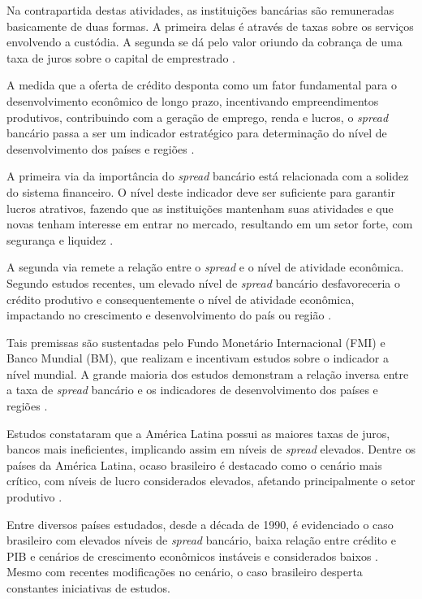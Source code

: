 \documentclass[
  12pt,
  12pt,
  openright,
  oneside,
  a4paper,
  chapter=TITLE,
  section=TITLE,
  subsection=TITLE,
  subsubsection=TITLE,
  english,
  portugues,
  sumario=tradicional]{abntex2}
\begin{document}
Na contrapartida destas atividades, as instituições bancárias são remuneradas basicamente de duas formas. A primeira delas é através de taxas sobre os serviços envolvendo a custódia. A segunda se dá pelo valor oriundo da cobrança de uma taxa de juros sobre o capital de emprestrado \cite{leite:1996, campello:2005, neves:2007}.

A medida que a oferta de crédito desponta como um fator fundamental para o desenvolvimento econômico de longo prazo, incentivando empreendimentos produtivos, contribuindo com a geração de emprego, renda e lucros, o \emph{spread} bancário passa a ser um indicador estratégico para determinação do nível de desenvolvimento dos países e regiões \cite{WB:2005, levine:1997}.

A primeira via da importância do \emph{spread} bancário está relacionada com a
solidez do sistema financeiro. O nível deste indicador deve ser suficiente para
garantir lucros atrativos, fazendo que as instituições mantenham suas
atividades e que novas tenham interesse em entrar no mercado, resultando em um
setor forte, com segurança e liquidez \cite{levine:1997, dantas:2012} \cite{leal:2006}.

A segunda via remete a relação entre o \emph{spread} e o nível de atividade
econômica. Segundo estudos recentes, um elevado nível de \emph{spread} bancário
desfavoreceria o crédito produtivo e consequentemente o nível de atividade
econômica, impactando no crescimento e desenvolvimento do país ou região \cite{WB:2005, dantas:2012, leal:2006}.

Tais premissas são sustentadas pelo Fundo Monetário Internacional (FMI) e Banco Mundial (BM), que realizam e incentivam estudos sobre o indicador a nível mundial. A grande maioria dos estudos demonstram a relação inversa entre a taxa de \emph{spread} bancário e os indicadores de desenvolvimento dos países e regiões \cite{WB:2005}.

Estudos constataram que a América Latina possui as maiores taxas de juros, bancos mais ineficientes, implicando assim em níveis de \emph{spread} elevados. Dentre os países da América Latina, ocaso brasileiro é destacado como o cenário mais crítico, com níveis de lucro considerados elevados, afetando principalmente o setor produtivo \cite{dantas:2012}.

Entre diversos países estudados, desde a década de 1990, é evidenciado o caso brasileiro com elevados níveis de \emph{spread} bancário, baixa relação entre crédito e PIB e cenários de crescimento econômicos instáveis e considerados baixos \cite{levine:1997, matos:2003}. Mesmo com recentes modificações no cenário, o caso brasileiro desperta constantes iniciativas de estudos.
\end{document}
